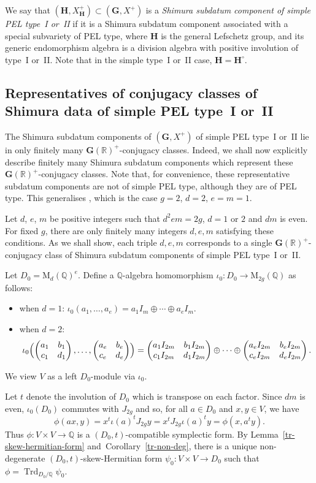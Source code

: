 \documentclass[JEP,XML,SOM,Unicode,NoFloatCountersInSection]{cedram}
\newcommand{\bQ}{\mathbb{Q}}
\newcommand{\bR}{\mathbb{R}}
\newcommand{\gG}{\mathbf{G}}
\newcommand{\gH}{\mathbf{H}}
\newcommand{\rM}{\mathrm{M}}
\DeclareMathOperator{\Trd}{Trd}
\newcommand{\fullmatrix}[4]{\left( \begin{matrix} #1 & #2 \\ #3 & #4 \end{matrix} \right)}
\newcommand{\defterm}[1]{\emph{#1}}
\begin{document}
We say that $(\gH, X_\gH^+) \subset (\gG, X^+)$ is a \defterm{Shimura subdatum component of simple PEL type~I or~II} if it is a Shimura subdatum component associated with a special subvariety of PEL type, where $\gH$ is the general Lefschetz group, and its generic endomorphism algebra is a division algebra with positive involution of type~I or~II.
Note that in the simple type~I or~II case, $\gH = \gH^\circ$.

\subsection{Representatives of conjugacy classes of Shimura data of simple PEL type~I or~II}
\label{subsec:shimura-representatives}

The Shimura subdatum components of $(\gG, X^+)$ of simple PEL type~I or~II lie in only finitely many $\gG(\bR)^+$-conjugacy classes.
Indeed, we shall now explicitly describe finitely many Shimura subdatum components which represent these $\gG(\bR)^+$-conjugacy classes.
Note that, for convenience, these representative subdatum components are not of simple PEL type, although they are of PEL type.
This generalises \cite[Lem.\,6.1]{QRTUI}, which is the case $g=2$, $d=2$, $e=m=1$.

Let $d$, $e$, $m$ be positive integers such that $d^2em = 2g$, $d=1$ or $2$ and $dm$ is even.
For fixed $g$, there are only finitely many integers $d,e,m$ satisfying these conditions.
As we shall show, each triple $d,e,m$ corresponds to a single $\gG(\bR)^+$-conjugacy class of Shimura subdatum components of simple PEL type~I or~II.

Let $D_0 = \rM_d(\bQ)^e$.
Define a $\bQ$-algebra homomorphism $\iota_0 \colon D_0 \to \rM_{2g}(\bQ)$ as follows:
\begin{itemize}
\item when $d=1$:
$\iota_0(a_1, \dotsc, a_e) = a_1 I_m \oplus \dotsb \oplus a_e I_m$.
\item when $d=2$:
\[
\iota_0\Bigl( \fullmatrix{a_1}{b_1}{c_1}{d_1}, \dotsc, \fullmatrix{a_e}{b_e}{c_e}{d_e} \Bigr)
= \fullmatrix{a_1I_{2m}}{b_1I_{2m}}{c_1I_{2m}}{d_1I_{2m}} \oplus \dotsb \oplus \fullmatrix{a_eI_{2m}}{b_eI_{2m}}{c_eI_{2m}}{d_eI_{2m}}.
\]
\end{itemize}
We view $V$ as a left $D_0$-module via $\iota_0$.

Let $t$ denote the involution of $D_0$ which is transpose on each factor.
Since $dm$ is even, $\iota_0(D_0)$ commutes with $J_{2g}$ and so, for all $a \in D_0$ and $x, y \in V$, we have
\[
\phi(ax, y) = x^t \iota(a)^t J_{2g} y = x^t J_{2g} \iota(a)^t y = \phi(x, a^t y).
\]
Thus $\phi \colon V \times V \to \bQ$ is a $(D_0,t)$-compatible symplectic form.
By Lemma~\ref{tr-skew-hermitian-form} and~Corolla\-ry~\ref{tr-non-deg}, there is a unique non-degenerate $(D_0,t)$-skew-Hermitian form $\psi_0 \colon V \times V \to D_0$ such that $\phi = \Trd_{D_0/\bQ} \psi_0$.
\end{document}
